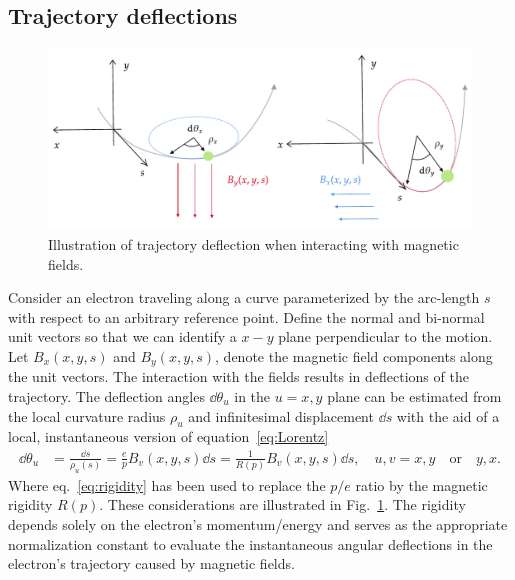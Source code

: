 \subsection{Trajectory deflections}
\begin{figure}[htb]
    \centering
    \includegraphics[width=\textwidth]{Images/deflections.pdf}
    \caption[Illustration of trajectory deflection when interacting with magnetic fields.]{Illustration of trajectory deflection when interacting with magnetic fields.}
    \label{fig:deflec_angles}
\end{figure}
Consider an electron traveling along a curve parameterized by the arc-length $s$ with respect to an arbitrary reference point. Define the normal and bi-normal unit vectors so that we can identify a $x-y$ plane perpendicular to the motion.  Let $B_x(x,y,s)$  and $B_y(x,y,s)$, denote the magnetic field components along the unit vectors. The interaction with the fields results in deflections of the trajectory. The deflection angles $\dd\theta_u$ in the $u=x,y$ plane can be estimated from the local curvature radius $\rho_u$ and infinitesimal displacement $\dd{s}$ with the aid of a local, instantaneous version of equation~\eqref{eq:Lorentz}
    \begin{equation}
        \begin{aligned}
            \dd{\theta_u} & = \frac{\dd{s}}{\rho_u(s)} = \frac{e}{p}B_v(x,y,s)\dd s = \frac{1}{R(p)}B_v(x,y,s)\dd s, \quad u,v=x, y \quad\text{or}\quad y,x.
        \end{aligned}
        \label{eq:deflec_angles}
    \end{equation}
Where eq.~\eqref{eq:rigidity} has been used to replace the $p/e$ ratio by the magnetic rigidity $R(p)$. These considerations are illustrated in Fig.~\ref{fig:deflec_angles}. The rigidity depends solely on the electron's momentum/energy and serves as the appropriate normalization constant to evaluate the instantaneous angular deflections in the electron's trajectory caused by magnetic fields.
